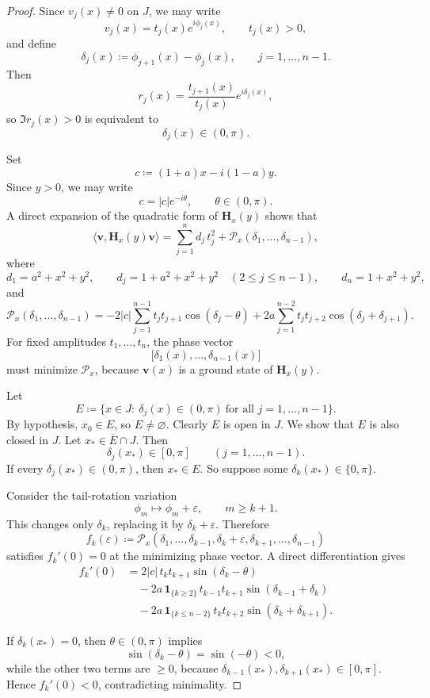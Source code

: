 \documentclass[11pt]{article}
\begin{document}
\begin{proof}
Since \(v_j(x)\neq 0\) on \(J\), we may write
\[
v_j(x)=t_j(x)e^{i\phi_j(x)},
\qquad
t_j(x)>0,
\]
and define
\[
\delta_j(x)\coloneqq \phi_{j+1}(x)-\phi_j(x),
\qquad
j=1,\dots,n-1.
\]
Then
\[
r_j(x)=\frac{t_{j+1}(x)}{t_j(x)}e^{i\delta_j(x)},
\]
so \(\Im r_j(x)>0\) is equivalent to
\[
\delta_j(x)\in(0,\pi).
\]

Set
\[
c\coloneqq (1+a)x-i(1-a)y.
\]
Since \(y>0\), we may write
\[
c=|c|e^{-i\theta},
\qquad
\theta\in(0,\pi).
\]
A direct expansion of the quadratic form of \(\mathbf H_x(y)\) shows that
\[
\langle \mathbf v,\mathbf H_x(y)\mathbf v\rangle
=
\sum_{j=1}^n d_j\,t_j^2
+
\mathcal P_x(\delta_1,\dots,\delta_{n-1}),
\]
where
\[
d_1=a^2+x^2+y^2,
\qquad
d_j=1+a^2+x^2+y^2\quad(2\le j\le n-1),
\qquad
d_n=1+x^2+y^2,
\]
and
\[
\mathcal P_x(\delta_1,\dots,\delta_{n-1})
=
-2|c|\sum_{j=1}^{n-1} t_j t_{j+1}\cos(\delta_j-\theta)
+
2a\sum_{j=1}^{n-2} t_j t_{j+2}\cos(\delta_j+\delta_{j+1}).
\]
For fixed amplitudes \(t_1,\dots,t_n\), the phase vector
\[
\bigl[\delta_1(x),\dots,\delta_{n-1}(x)\bigr]
\]
must minimize \(\mathcal P_x\), because \(\mathbf v(x)\) is a ground state of \(\mathbf H_x(y)\).

Let
\[
E\coloneqq \{x\in J:\ \delta_j(x)\in(0,\pi)\ \text{for all }j=1,\dots,n-1\}.
\]
By hypothesis, \(x_0\in E\), so \(E\neq\varnothing\). Clearly \(E\) is open in \(J\). We show that \(E\) is also closed in \(J\). Let \(x_*\in \overline E\cap J\). Then
\[
\delta_j(x_*)\in[0,\pi]
\qquad
(j=1,\dots,n-1).
\]
If every \(\delta_j(x_*)\in(0,\pi)\), then \(x_*\in E\). So suppose some \(\delta_k(x_*)\in\{0,\pi\}\).

Consider the tail-rotation variation
\[
\phi_m\mapsto \phi_m+\varepsilon,
\qquad
m\ge k+1.
\]
This changes only \(\delta_k\), replacing it by \(\delta_k+\varepsilon\). Therefore
\[
f_k(\varepsilon)\coloneqq
\mathcal P_x(\delta_1,\dots,\delta_{k-1},\delta_k+\varepsilon,\delta_{k+1},\dots,\delta_{n-1})
\]
satisfies \(f_k'(0)=0\) at the minimizing phase vector. A direct differentiation gives
\begin{align*}
f_k'(0)
&=
2|c|\,t_k t_{k+1}\sin(\delta_k-\theta) \\
&\quad
-2a\,\mathbf 1_{\{k\ge 2\}}\,t_{k-1}t_{k+1}\sin(\delta_{k-1}+\delta_k) \\
&\quad
-2a\,\mathbf 1_{\{k\le n-2\}}\,t_k t_{k+2}\sin(\delta_k+\delta_{k+1}).
\end{align*}

If \(\delta_k(x_*)=0\), then \(\theta\in(0,\pi)\) implies
\[
\sin(\delta_k-\theta)=\sin(-\theta)<0,
\]
while the other two terms are \(\ge 0\), because \(\delta_{k-1}(x_*),\delta_{k+1}(x_*)\in[0,\pi]\). Hence \(f_k'(0)<0\), contradicting minimality.


\end{proof}
\end{document}
